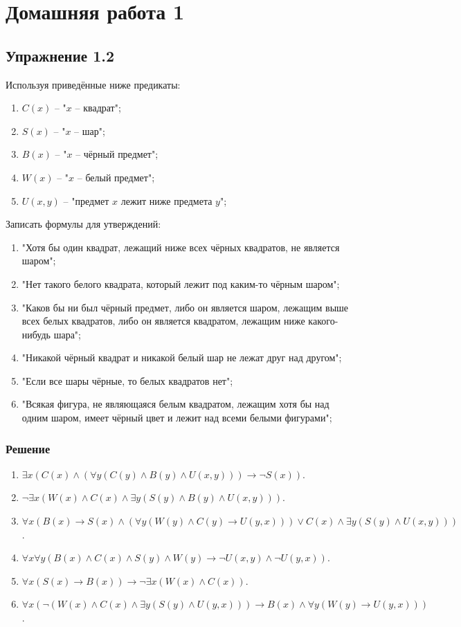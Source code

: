 \documentclass[11pt]{article}
\author{Sergey Makarov}
\date{\today}
\title{}
\begin{document}
\tableofcontents


\section{Домашняя работа 1}
\label{sec:orgf762115}
\subsection{Упражнение 1.2}
\label{sec:org6c6dbe4}
Используя приведённые ниже предикаты:
\begin{enumerate}
\item \(C(x)\) -- "\(x\) -- квадрат";
\item \(S(x)\) -- "\(x\) -- шар";
\item \(B(x)\) -- "\(x\) -- чёрный предмет";
\item \(W(x)\) -- "\(x\) -- белый предмет";
\item \(U(x, y)\) -- "предмет \(x\) лежит ниже предмета \(y\)";
\end{enumerate}
Записать формулы для утверждений:
\begin{enumerate}
\item "Хотя бы один квадрат, лежащий ниже всех чёрных квадратов, не является шаром";
\item "Нет такого белого квадрата, который лежит под каким-то чёрным шаром";
\item "Каков бы ни был чёрный предмет, либо он является шаром, лежащим выше всех белых квадратов, либо он является квадратом, лежащим ниже какого-нибудь шара";
\item "Никакой чёрный квадрат и никакой белый шар не лежат друг над другом";
\item "Если все шары чёрные, то белых квадратов нет";
\item "Всякая фигура, не являющаяся белым квадратом, лежащим хотя бы над одним шаром, имеет чёрный цвет и лежит над всеми белыми фигурами";
\end{enumerate}
\subsubsection{Решение}
\label{sec:org3629baf}
\begin{enumerate}
\item \(\exists x (C(x) \land (\forall y (C(y) \land B(y) \land U(x, y))) \to \lnot S(x))\).
\item \(\lnot \exists x (W(x) \land C(x) \land \exists y (S(y) \land B(y) \land U(x, y)))\).
\item \(\forall x (B(x) \to S(x) \land (\forall y (W(y) \land C(y) \to U(y, x))) \lor C(x) \land \exists y (S(y) \land U(x, y)))\).
\item \(\forall x \forall y (B(x) \land C(x) \land S(y) \land W(y) \to \neg U(x, y) \land \neg U(y, x))\).
\item \(\forall x (S(x) \to B(x)) \to \lnot \exists x (W(x) \land C(x))\).
\item \(\forall x (\lnot (W(x) \land C(x) \land \exists y (S(y) \land U(y, x))) \to B(x) \land \forall y (W(y) \to U(y, x)))\).
\end{enumerate}
\end{document}
